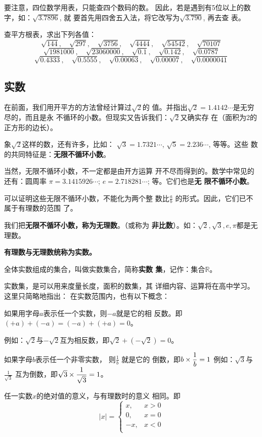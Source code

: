 要注意，四位数学用表，只能查四个数码的数。
因此，若是遇到有5位以上的数字，如：$\sqrt{3.7896}$, 就
要首先用四舍五入法，将它改写为$\sqrt{3.790}$, 再去查
表。

\begin{ex}
    查平方根表，求出下列各值：
\[\sqrt{144},\quad \sqrt{297},\quad \sqrt{3756},\quad \sqrt{4444},\quad \sqrt{54542},\quad \sqrt{70107} \]
\[\sqrt{1981000},\quad \sqrt{23060000},\quad \sqrt{0.1},\quad \sqrt{0.142},\quad \sqrt{0.0787} \]
\[\sqrt{0.4333},\quad \sqrt{0.5555},\quad \sqrt{0.00063},\quad \sqrt{0.00007},\quad \sqrt{0.0000041} \]
\end{ex}

\subsection{实数}
在前面，我们用开平方的方法曾经计算过$\sqrt{2}$的
值。并指出$\sqrt{2}=1.4142\cdots$是无穷尽的，而且是永
不循环的小数。但现实又告诉我们：$\sqrt{2}$又确实存
在（面积为2的正方形的边长）。

象$\sqrt{2}$这样的数，还有许多，比如：
$\sqrt{3}=1.7321\cdots$, $\sqrt{5}=2.236\cdots$, 等等。这些
数的共同特征是：\textbf{无限不循环小数}。

当然，无限不循环小数，不一定都是由开方运算
开不尽而得到的。数学中常见的还有：圆周率
$\pi=3.1415926\cdots$; $e=2.718281\cdots$; 等。它们也是\textbf{无
限不循环小数}。

可以证明这些无限不循环小数，不能化为两个整
数比$\frac{a}{b}$
的形式。因此，它们已不属于有理数的范围
了。

我们把\textbf{无限不循环小数，称为无理数}。（或称为
\textbf{非比数}）。如：$\sqrt{2},\sqrt{3},e,\pi$都是无理数。

\textbf{有理数与无理数统称为实数。}

全体实数组成的集合，叫做实数集合，简称\textbf{实数
集}，记作：集合$\mathbb{R}$。

实数集，是可以用来度量长度，面积的数集，其
详细内容、运算将在高中学习。这里只简略地指出：
在实数范围内，也有以下概念：

如果用字母$a$表示任一个实数，则$-a$就是它的相
反数。即$(+a)+(-a)=(-a)+(+a)=0$。

例如：$\sqrt{2}$与$-\sqrt{2}$互为相反数，即$\sqrt{2}+\left(-\sqrt{2}\right)=0$。

如果字母$b$表示任一个非零实数，
则$\frac{1}{b}$
就是它的
倒数，即$b\times\dfrac{1}{b}=1$
例如：$\sqrt{3}$与$\frac{1}{\sqrt{3}}$
互为倒数，即$\sqrt{3}\times \dfrac{1}{\sqrt{3}}=1$。

任一实数$x$的绝对值的意义，与有理数时的意义
相同。即
\[|x|=\begin{cases}
    x, & x>0\\
    0, & x=0\\
    -x, & x<0\\  
\end{cases}\]

